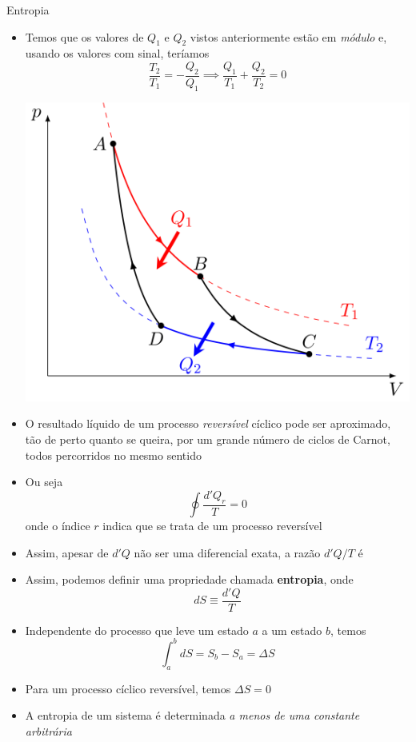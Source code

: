 \documentclass[t,%
brazilian,%
11pt,%
aspectratio=169,%
table%
]{beamer}
\begin{document}
\begin{frame}{Entropia}
    \begin{itemize}
        \item Temos que os valores de \(Q_1\) e \(Q_2\) vistos anteriormente estão em \textit{módulo}
            e, usando os valores com sinal, teríamos
            \[
                \frac{T_2}{T_1}=-\frac{Q_2}{Q_1} \implies \frac{Q_1}{T_1} + \frac{Q_2}{T_2}=0
            \]
            \begin{center}
                \includegraphics[height=\textheight-92pt-42pt]{images/Carnot-cycle-p-V-diagram.svg.png}
            \end{center}
        \item O resultado líquido de um processo \textit{reversível} cíclico pode ser 
            aproximado, tão de perto quanto se queira, por um grande número de ciclos de Carnot,
            todos percorridos no mesmo sentido
    \end{itemize}
\end{frame}

\begin{frame}
    \begin{itemize}
        \item Ou seja
            \[
                \oint {\frac{d'Q_r}{T}} = 0
            \]
            onde o índice \(r\) indica que se trata de um processo reversível
        \item Assim, apesar de \(d'Q\) não ser uma diferencial exata, a razão \(d'Q/T\) é
        \item Assim, podemos definir uma propriedade chamada \textbf{entropia}, onde
            \[
                dS \equiv \frac{d'Q}{T}
            \]
        \item Independente do processo que leve um estado \(a\) a um estado \(b\), temos 
            \[
                \int_{a}^{b} dS=S_b - S_a = \Delta S
            \]
        \item Para um processo cíclico reversível, temos \(\Delta S=0\)
        \item A entropia de um sistema é determinada \textit{a menos de uma constante arbitrária}

    \end{itemize}
\end{frame}
\end{document}
